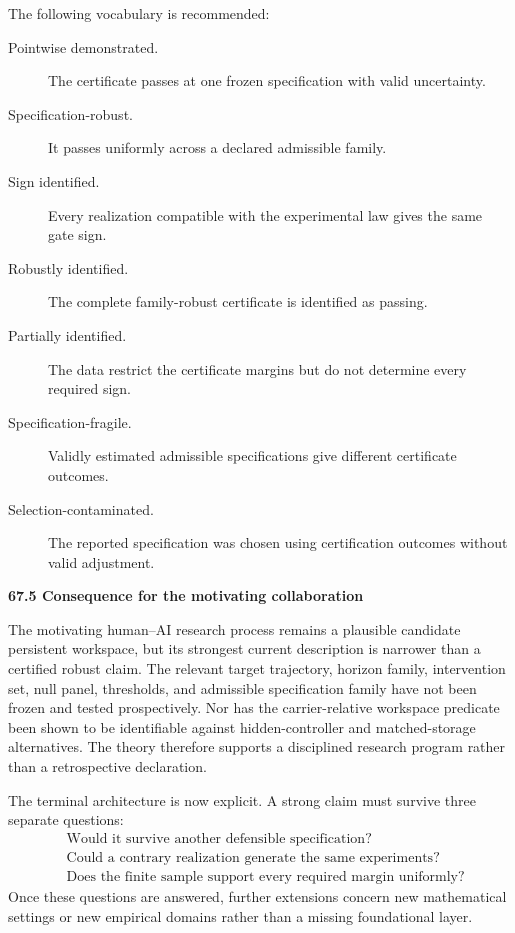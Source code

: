 \documentclass[11pt,letterpaper]{article}
\newcommand{\subtopic}[1]{%
 \vspace{0.45em}
 {\bfseries\color{AccentColor} #1\par}
}
\theoremstyle{plain}
\theoremstyle{definition}
\begin{document}
The following vocabulary is recommended:
\begin{description}
\item[Pointwise demonstrated.] The certificate passes at one frozen
 specification with valid uncertainty.
\item[Specification-robust.] It passes uniformly across a declared admissible
 family.
\item[Sign identified.] Every realization compatible with the experimental
 law gives the same gate sign.
\item[Robustly identified.] The complete family-robust certificate is
 identified as passing.
\item[Partially identified.] The data restrict the certificate margins but do
 not determine every required sign.
\item[Specification-fragile.] Validly estimated admissible specifications give
 different certificate outcomes.
\item[Selection-contaminated.] The reported specification was chosen using
 certification outcomes without valid adjustment.
\end{description}

\subtopic{67.5 Consequence for the motivating collaboration}

The motivating human--AI research process remains a plausible candidate
persistent workspace, but its strongest current description is narrower than
a certified robust claim. The relevant target trajectory, horizon family,
intervention set, null panel, thresholds, and admissible specification family
have not been frozen and tested prospectively. Nor has the carrier-relative
workspace predicate been shown to be identifiable against hidden-controller
and matched-storage alternatives. The theory therefore supports a disciplined
research program rather than a retrospective declaration.

The terminal architecture is now explicit. A strong claim must survive three
separate questions:
\[
\boxed{
\begin{aligned}
&\text{Would it survive another defensible specification?}\\
&\text{Could a contrary realization generate the same experiments?}\\
&\text{Does the finite sample support every required margin uniformly?}
\end{aligned}
}
\]
Once these questions are answered, further extensions concern new mathematical
settings or new empirical domains rather than a missing foundational layer.
\end{document}
